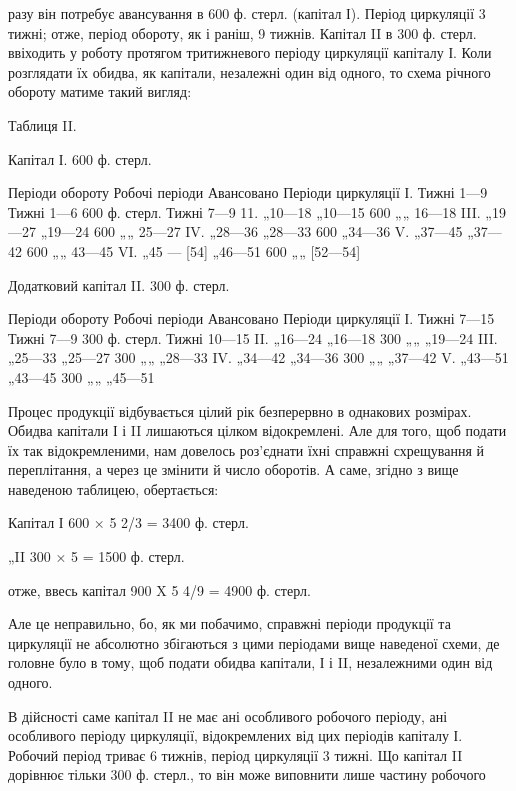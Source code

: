 \parcont{}  %
разу він потребує авансування в 600 ф. стерл. (капітал І). Період циркуляції
3 тижні; отже, період обороту, як і раніш, 9 тижнів. Капітал II
в 300 ф. стерл. ввіходить у роботу протягом тритижневого періоду циркуляції
капіталу І. Коли розглядати їх обидва, як капітали, незалежні
один від одного, то схема річного обороту матиме такий вигляд:

Таблиця II.

Капітал І. 600 ф. стерл.

Періоди обороту    Робочі періоди    Авансовано    Періоди циркуляції
І. Тижні 1—9    Тижні 1—6    600 ф. стерл. Тижні 7—9
11. „10—18 „10—15    600 „„ 16—18
III. „19—27 „19—24    600 „„ 25—27
IV. „28—36 „28—33    600 „34—36
V. „37—45 „37—42    600 „„ 43—45
VI. „45 — [54] „46—51    600 „„ [52—54]

Додатковий капітал II. 300 ф. стерл.

Періоди обороту    Робочі періоди    Авансовано    Періоди циркуляції
І. Тижні 7—15    Тижні 7—9    300 ф. стерл. Тижні 10—15
II. „16—24 „16—18    300 „„ „19—24
III. „25—33 „25—27    300 „„ „28—33
IV. „34—42 „34—36    300 „„ „37—42
V. „43—51 „43—45    300 „„ „45—51

Процес продукції відбувається цілий рік безперервно в однакових
розмірах. Обидва капітали І і II лишаються цілком відокремлені. Але
для того, щоб подати їх так відокремленими, нам довелось роз’єднати
їхні справжні схрещування й переплітання, а через це змінити й число
оборотів. А саме, згідно з вище наведеною таблицею, обертається:

Капітал І 600 × 5 2/3 = 3400 ф. стерл.

„II 300 × 5 = 1500 ф. стерл.

отже, ввесь капітал    900 X 5 4/9 = 4900 ф. стерл.

Але це неправильно, бо, як ми побачимо, справжні періоди продукції
та циркуляції не абсолютно збігаються з цими періодами вище наведеної
схеми, де головне було в тому, щоб подати обидва капітали, І і II, незалежними
один від одного.

В дійсності саме капітал II не має ані особливого робочого періоду, ані особливого
періоду циркуляції, відокремлених від цих періодів капіталу І. Робочий
період триває 6 тижнів, період циркуляції 3 тижні. Що капітал II дорівнює
тільки 300 ф. стерл., то він може виповнити лише частину робочого
\parbreak{}  %
